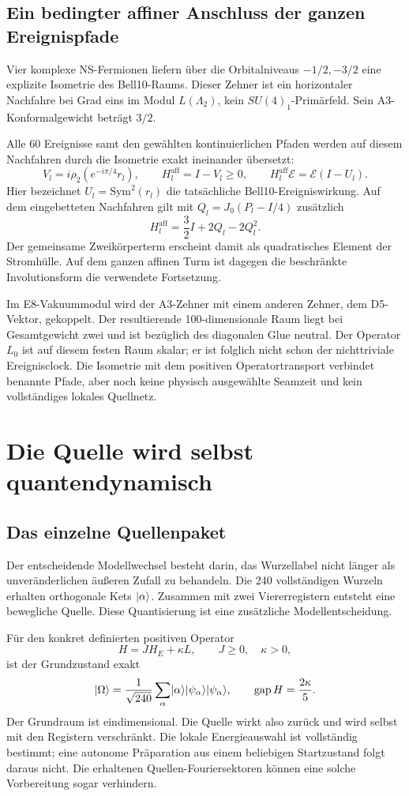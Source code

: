 \section{Ein bedingter affiner Anschluss der ganzen Ereignispfade}
Vier komplexe NS-Fermionen liefern über die Orbitalniveaus $-1/2,-3/2$ eine explizite Isometrie des Bell10-Raums. Dieser Zehner ist ein horizontaler Nachfahre bei Grad eins im Modul $L(\Lambda_2)$, kein $SU(4)_1$-Primärfeld. Sein A3-Konformalgewicht beträgt $3/2$. 

Alle 60 Ereignisse samt den gewählten kontinuierlichen Pfaden werden auf diesem Nachfahren durch die Isometrie exakt ineinander übersetzt:
\[
 V_l=i\rho_2(e^{-i\pi/4}r_l),\qquad
 H_l^{\mathrm{aff}}=I-V_l\ge0,\qquad
 H_l^{\mathrm{aff}}\mathcal E=\mathcal E(I-U_l).
\]
Hier bezeichnet $U_l=\mathrm{Sym}^2(r_l)$ die tatsächliche Bell10-Ereigniswirkung. Auf dem eingebetteten Nachfahren gilt mit $Q_l=J_0(P_l-I/4)$ zusätzlich
\[
 H_l^{\mathrm{aff}}=\frac32I+2Q_l-2Q_l^2.
\]
Der gemeinsame Zweikörperterm erscheint damit als quadratisches Element der Stromhülle. Auf dem ganzen affinen Turm ist dagegen die beschränkte Involutionsform die verwendete Fortsetzung.

Im E8-Vakuummodul wird der A3-Zehner mit einem anderen Zehner, dem D5-Vektor, gekoppelt. Der resultierende 100-dimensionale Raum liegt bei Gesamtgewicht zwei und ist bezüglich des diagonalen Glue neutral. Der Operator $L_0$ ist auf diesem festen Raum skalar; er ist folglich nicht schon der nichttriviale Ereignisclock. Die Isometrie mit dem positiven Operatortransport verbindet benannte Pfade, aber noch keine physisch ausgewählte Seamzeit und kein vollständiges lokales Quellnetz.

\chapter{Die Quelle wird selbst quantendynamisch}
\section{Das einzelne Quellenpaket}
Der entscheidende Modellwechsel besteht darin, das Wurzellabel nicht länger als unveränderlichen äußeren Zufall zu behandeln. Die 240 vollständigen Wurzeln erhalten orthogonale Kets $\lvert \alpha\rangle$. Zusammen mit zwei Viererregistern entsteht eine bewegliche Quelle. Diese Quantisierung ist eine zusätzliche Modellentscheidung. 

Für den konkret definierten positiven Operator
\[
 H=JH_E+\kappa L,\qquad J\ge0,\quad\kappa>0,
\]
ist der Grundzustand exakt
\[
 \lvert \Omega\rangle=\frac1{\sqrt{240}}\sum_\alpha
 \lvert \alpha\rangle\lvert \psi_\alpha\rangle\lvert \psi_\alpha\rangle,
 \qquad\operatorname{gap} H=\frac{2\kappa}5.
\]
Der Grundraum ist eindimensional. Die Quelle wirkt also zurück und wird selbst mit den Registern verschränkt. Die lokale Energieauswahl ist vollständig bestimmt; eine autonome Präparation aus einem beliebigen Startzustand folgt daraus nicht. Die erhaltenen Quellen-Fouriersektoren können eine solche Vorbereitung sogar verhindern. 

